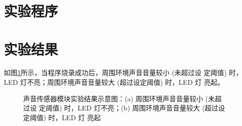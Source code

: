 \documentclass[UTF8, oneside]{ctexbook}
\begin{document}
\section{实验程序}


\section{实验结果}
\paragraph{}
如图\ref{s21_1}所示，当程序烧录成功后，周围环境声音音量较小 (未超过设
定阈值) 时，LED 灯不亮；周围环境声音音量较大 (超过设定阈值) 时，LED 灯
亮起。

\begin{figure}[h]
    \centering


    \centering
    \caption{声音传感器模块实验结果示意图：(a) 周围环境声音音量较小 (未超过设
    定阈值) 时，LED 灯不亮；(b) 周围环境声音音量较大 (超过设定阈值) 时，LED 灯
    亮起}
    \label{s21_1}
    
\end{figure}
\end{document}
